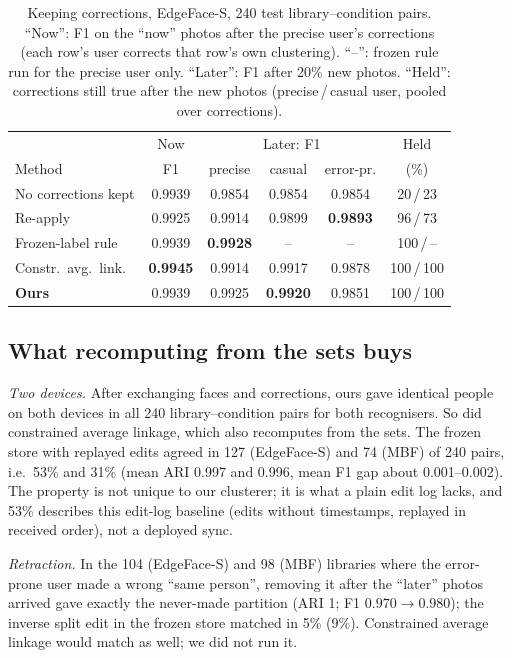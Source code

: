 \documentclass[conference]{IEEEtran}
\begin{document}
\begin{table}[t]
\caption{Keeping corrections, EdgeFace-S, 240 test library--condition pairs. ``Now'': F1 on the ``now'' photos after the precise user's
corrections (each row's user corrects that row's own clustering). ``--'': frozen rule run for the precise user only. ``Later'': F1 after 20\% new photos. ``Held'': corrections
still true after the new photos (precise\,/\,casual user, pooled over corrections).}
\label{tab:corr}
\centering\footnotesize
\setlength{\tabcolsep}{1.8pt}
\begin{tabular}{lccccc}
\toprule
 & Now & \multicolumn{3}{c}{Later: F1} & Held \\
Method & F1 & precise & casual & error-pr. & (\%) \\
\midrule
No corrections kept  & 0.9939 & 0.9854 & 0.9854 & 0.9854 & 20\,/\,23 \\
Re-apply & 0.9925 & 0.9914 & 0.9899 & \textbf{0.9893} & 96\,/\,73 \\
Frozen-label rule & 0.9939 & \textbf{0.9928} & -- & -- & 100\,/\,-- \\
Constr.\ avg.\ link. & \textbf{0.9945} & 0.9914 & 0.9917 & 0.9878 & 100\,/\,100 \\
\textbf{Ours}        & 0.9939 & 0.9925 & \textbf{0.9920} & 0.9851 & 100\,/\,100 \\
\bottomrule
\end{tabular}
\end{table}

\subsection{What recomputing from the sets buys}\label{sec:conseq}
\emph{Two devices.} After exchanging faces and corrections, ours gave identical people on both devices in all 240
library--condition pairs for both recognisers. So did constrained average linkage, which also recomputes from the sets. The
frozen store with replayed edits agreed in 127 (EdgeFace-S) and 74 (MBF) of 240 pairs, i.e.\ 53\% and 31\% (mean ARI 0.997 and 0.996, mean F1 gap about 0.001--0.002). The property
is not unique to our clusterer; it is what a plain edit log lacks, and 53\% describes this edit-log baseline (edits without
timestamps, replayed in received order), not a deployed sync.

\emph{Retraction.} In the 104 (EdgeFace-S) and 98 (MBF) libraries where the error-prone user made a wrong ``same person'',
removing it after the ``later'' photos arrived gave exactly the never-made partition (ARI 1; F1 $0.970\to0.980$); the inverse split
edit in the frozen store matched in 5\% (9\%). Constrained average linkage would match as well; we did not run it.
\end{document}

